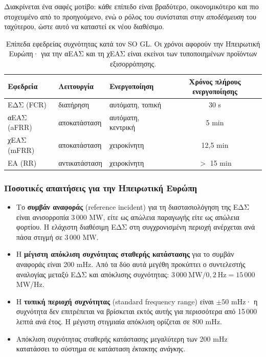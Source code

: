 Διακρίνεται ένα σαφές μοτίβο: κάθε επίπεδο είναι βραδύτερο, οικονομικότερο και πιο
στοχευμένο από το προηγούμενο, ενώ ο ρόλος του συνίσταται στην \emph{αποδέσμευση} του
ταχύτερου, ώστε αυτό να καταστεί εκ νέου διαθέσιμο.

\begin{table}[!htbp]
\centering
\begin{tabular}{lllc}
\hline
Εφεδρεία & Λειτουργία & Ενεργοποίηση & Χρόνος πλήρους ενεργοποίησης \\
\hline
ΕΔΣ (FCR)   & διατήρηση      & αυτόματη, τοπική   & 30 s \\
αΕΑΣ (aFRR) & αποκατάσταση   & αυτόματη, κεντρική & 5 min \\
χΕΑΣ (mFRR) & αποκατάσταση   & χειροκίνητη        & 12,5 min \\
ΕΑ (RR)     & αντικατάσταση  & χειροκίνητη        & $>$ 15 min \\
\hline
\end{tabular}
\caption{Επίπεδα εφεδρείας συχνότητας κατά τον SO GL. Οι χρόνοι αφορούν την Ηπειρωτική
Ευρώπη· για την αΕΑΣ και τη χΕΑΣ είναι εκείνοι των τυποποιημένων προϊόντων εξισορρόπησης.}
\label{tab:reserves}
\end{table}

\subsubsection*{Ποσοτικές απαιτήσεις για την Ηπειρωτική Ευρώπη}

\begin{itemize}
\item Το \textbf{συμβάν αναφοράς} (reference incident) για τη διαστασιολόγηση της ΕΔΣ είναι
      ανισορροπία 3\,000 MW, είτε ως απώλεια παραγωγής είτε ως απώλεια φορτίου. Η ελάχιστη
      διαθέσιμη ΕΔΣ στη συγχρονισμένη περιοχή ανέρχεται ανά πάσα στιγμή σε 3\,000 MW.
\item Η \textbf{μέγιστη απόκλιση συχνότητας σταθερής κατάστασης} για το συμβάν αναφοράς
      είναι 200 mHz. Από τα δύο αυτά μεγέθη προκύπτει ο συντελεστής αναλογίας μεταξύ ΕΔΣ
      και απόκλισης συχνότητας: $3\,000\ \text{MW} / 0{,}2\ \text{Hz} = 15\,000$ MW/Hz.
\item Η \textbf{τυπική περιοχή συχνότητας} (standard frequency range) είναι $\pm 50$ mHz·
      η συχνότητα δεν επιτρέπεται να βρίσκεται εκτός αυτής για περισσότερα από
      15\,000 λεπτά ανά έτος. Η μέγιστη στιγμιαία απόκλιση
      ορίζεται σε 800 mHz.
\item Απόκλιση συχνότητας σταθερής κατάστασης μεγαλύτερη των 200 mHz κατατάσσει το
      σύστημα σε κατάσταση \emph{έκτακτης ανάγκης}.
\end{itemize}

